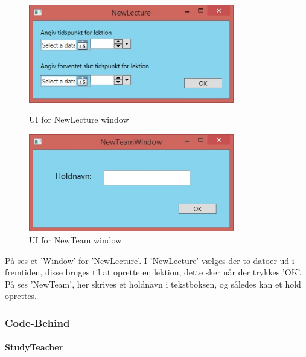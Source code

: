 \begin{figure}[htbp]
\centering
\begin{minipage}{.5\textwidth}
  \centering
  \includegraphics[width=0.8\textwidth]{images/UI/NewLecture.jpg}
  \caption[UINewLecture]{UI for NewLecture window}
  \label{fig:NewLecture}
\end{minipage}%
\begin{minipage}{.5\textwidth}
  \centering
  \includegraphics[width=0.8\textwidth]{images/UI/NewTeam.jpg}
  \caption[UINewTeam]{UI for NewTeam window}
  \label{fig:NewTeam}
\end{minipage}%
\end{figure}

På  ses et 'Window' for 'NewLecture'. 
I 'NewLecture' vælges der to datoer ud i fremtiden, disse bruges til at oprette en lektion, dette sker når der trykkes 'OK'. 
På  ses 'NewTeam', her skrives et holdnavn i tekstboksen, og således kan et hold oprettes.

\subsubsection{Code-Behind}
\paragraph{StudyTeacher}
